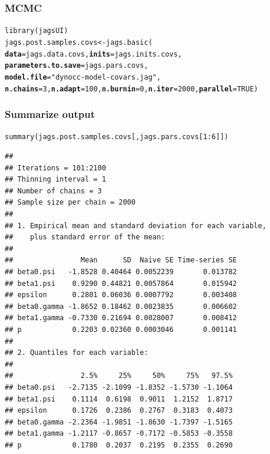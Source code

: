 \documentclass[color=usenames,dvipsnames,handout]{beamer}\usepackage[]{graphicx}\usepackage[]{xcolor}
\makeatletter
\newcommand{\hlnum}[1]{\textcolor[rgb]{0.69,0.494,0}{#1}}%
\newcommand{\hlsng}[1]{\textcolor[rgb]{0.749,0.012,0.012}{#1}}%
\newcommand{\hlopt}[1]{\textcolor[rgb]{0,0,0}{#1}}%
\newcommand{\hldef}[1]{\textcolor[rgb]{0,0,0}{#1}}%
\newcommand{\hlkwb}[1]{\textcolor[rgb]{0,0.341,0.682}{#1}}%
\newcommand{\hlkwc}[1]{\textcolor[rgb]{0,0,0}{\textbf{#1}}}%
\newcommand{\hlkwd}[1]{\textcolor[rgb]{0.004,0.004,0.506}{#1}}%
\newenvironment{kframe}{%
 \def\at@end@of@kframe{}%
 \ifinner\ifhmode%
  \def\at@end@of@kframe{\end{minipage}}%
  \begin{minipage}{\columnwidth}%
 \fi\fi%
 \def\FrameCommand##1{\hskip\@totalleftmargin \hskip-\fboxsep
 \colorbox{shadecolor}{##1}\hskip-\fboxsep
     \hskip-\linewidth \hskip-\@totalleftmargin \hskip\columnwidth}%
 \MakeFramed {\advance\hsize-\width
   \@totalleftmargin\z@ \linewidth\hsize
   \@setminipage}}%
 {\par\unskip\endMakeFramed%
 \at@end@of@kframe}
\newenvironment{knitrout}{}{} %
\makeatother
\begin{document}
\begin{frame}[fragile]
  \frametitle{MCMC}
  \small
\begin{knitrout}\scriptsize
{}\color{fgcolor}\begin{kframe}
\begin{alltt}
\hlkwd{library}\hldef{(jagsUI)}
\hldef{jags.post.samples.covs} \hlkwb{<-} \hlkwd{jags.basic}\hldef{(}
    \hlkwc{data}\hldef{=jags.data.covs,} \hlkwc{inits}\hldef{=jags.inits.covs,}
    \hlkwc{parameters.to.save}\hldef{=jags.pars.covs,}
    \hlkwc{model.file}\hldef{=}\hlsng{"dynocc-model-covars.jag"}\hldef{,}
    \hlkwc{n.chains}\hldef{=}\hlnum{3}\hldef{,} \hlkwc{n.adapt}\hldef{=}\hlnum{100}\hldef{,} \hlkwc{n.burnin}\hldef{=}\hlnum{0}\hldef{,} \hlkwc{n.iter}\hldef{=}\hlnum{2000}\hldef{,} \hlkwc{parallel}\hldef{=}\hlnum{TRUE}\hldef{)}
\end{alltt}
\end{kframe}
\end{knitrout}
\end{frame}



\begin{frame}[fragile]
  \frametitle{Summarize output}
\begin{knitrout}\tiny
{}\color{fgcolor}\begin{kframe}
\begin{alltt}
\hlkwd{summary}\hldef{(jags.post.samples.covs[,jags.pars.covs[}\hlnum{1}\hlopt{:}\hlnum{6}\hldef{]])}
\end{alltt}
\begin{verbatim}
## 
## Iterations = 101:2100
## Thinning interval = 1 
## Number of chains = 3 
## Sample size per chain = 2000 
## 
## 1. Empirical mean and standard deviation for each variable,
##    plus standard error of the mean:
## 
##                Mean      SD  Naive SE Time-series SE
## beta0.psi   -1.8528 0.40464 0.0052239       0.013782
## beta1.psi    0.9290 0.44821 0.0057864       0.015942
## epsilon      0.2801 0.06036 0.0007792       0.003408
## beta0.gamma -1.8652 0.18462 0.0023835       0.006602
## beta1.gamma -0.7330 0.21694 0.0028007       0.008412
## p            0.2203 0.02360 0.0003046       0.001141
## 
## 2. Quantiles for each variable:
## 
##                2.5%     25%     50%     75%   97.5%
## beta0.psi   -2.7135 -2.1099 -1.8352 -1.5730 -1.1064
## beta1.psi    0.1114  0.6198  0.9011  1.2152  1.8717
## epsilon      0.1726  0.2386  0.2767  0.3183  0.4073
## beta0.gamma -2.2364 -1.9851 -1.8630 -1.7397 -1.5165
## beta1.gamma -1.2117 -0.8657 -0.7172 -0.5853 -0.3558
## p            0.1780  0.2037  0.2195  0.2355  0.2690
\end{verbatim}
\end{kframe}
\end{knitrout}
\end{frame}
\end{document}
